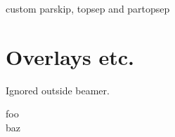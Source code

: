 \documentclass[a4paper]{article}
\begin{document}
\begin{pseudo}[topsep=1cm, partopsep=1cm]
custom parskip, topsep and partopsep
\end{pseudo}

\section*{Overlays etc.}

Ignored outside \textsf{beamer}.

\begin{pseudo}[pause, kwfont<3>=\nf, unknown<3>=42]
    foo \\<2>
    baz
\end{pseudo}

\end{document}
